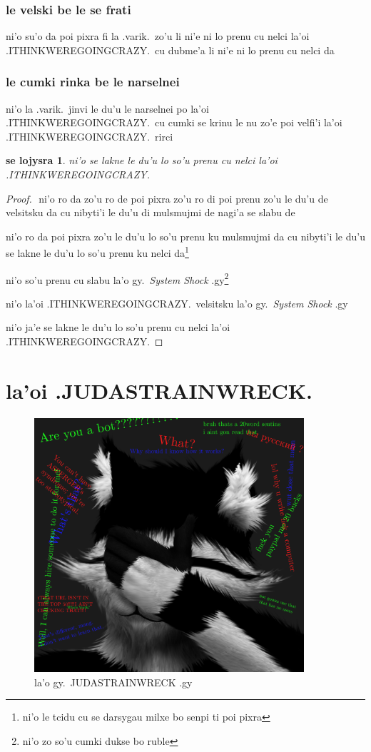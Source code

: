 \documentclass{report}
\newtheorem{thm}{se lojysra}
\begin{document}
\subsection{le velski be le se frati}
ni'o su'o da poi pixra fi la .varik.\ zo'u li ni'e ni lo prenu cu nelci la'oi .ITHINKWEREGOINGCRAZY.\ cu dubme'a li ni'e ni lo prenu cu nelci da

\subsection{le cumki rinka be le narselnei}
ni'o la .varik.\ jinvi le du'u le narselnei po la'oi .ITHINKWEREGOINGCRAZY.\ cu cumki se krinu le nu zo'e poi velfi'i la'oi .ITHINKWEREGOINGCRAZY.\ rirci

\begin{thm}
ni'o se lakne le du'u lo so'u prenu cu nelci la'oi .ITHINKWEREGOINGCRAZY.

\end{thm}
\begin{proof}
${}$
ni'o ro da zo'u ro de poi pixra zo'u ro di poi prenu zo'u le du'u de velsitsku da cu nibyti'i le du'u di mulsmujmi de nagi'a se slabu de

ni'o ro da poi pixra zo'u le du'u lo so'u prenu ku mulsmujmi da cu nibyti'i le du'u se lakne le du'u lo so'u prenu ku nelci da\footnote{ni'o le tcidu cu se darsygau milxe bo senpi ti poi pixra}

ni'o so'u prenu cu slabu la'o gy.\ \textit{System Shock} .gy\footnote{ni'o zo so'u cumki dukse bo ruble}

ni'o la'oi .ITHINKWEREGOINGCRAZY.\ velsitsku la'o gy.\ \textit{System Shock} .gy

ni'o ja'e se lakne le du'u lo so'u prenu cu nelci la'oi .ITHINKWEREGOINGCRAZY.

\end{proof}
\chapter{la'oi .JUDASTRAINWRECK.}
\begin{figure}[ht]
	\centering
	\includegraphics[width=10cm]{judastrainwreck/judastrainwreck.png}
	\caption[center]{la'o gy.\ JUDASTRAINWRECK .gy}
\end{figure}
\end{document}
